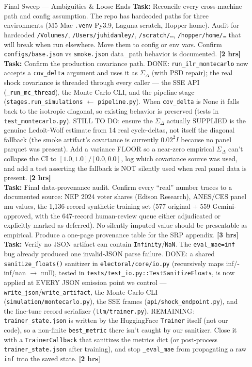 \documentclass[11pt]{article}
\newcommand{\hrs}[1]{\textbf{[#1 hrs]}}
\newcommand{\task}[2]{%
  \noindent\textbf{Task:} #1 \hfill \hrs{#2}\\}
\begin{document}
\begin{taskbox}{Final Sweep --- Ambiguities \& Loose Ends}
\task{Reconcile every cross-machine path and config assumption. The repo
  has hardcoded paths for three environments (M5 Mac \texttt{.venv} Py3.9,
  Laguna scratch, Hopper home). Audit for hardcoded \texttt{/Volumes/},
  \texttt{/Users/juhidamley/}, \texttt{/scratch/\ldots},
  \texttt{/hopper/home/\ldots} that will break when run elsewhere. Move them
  to config or env vars. Confirm \texttt{configs/base.json}
  vs \texttt{smoke.json} data\_path behavior is documented.}{2}

\task{Confirm the production covariance path. DONE: \texttt{run\_ilr\_montecarlo}
  now accepts a \texttt{cov\_delta} argument and uses it as $\Sigma_\Delta$ (with
  PSD repair); the real shock covariance is threaded through every caller --- the
  SSE API (\texttt{\_run\_mc\_thread}), the Monte Carlo CLI, and the pipeline
  stage (\texttt{stages.run\_simulations} $\leftarrow$ \texttt{pipeline.py}). When
  \texttt{cov\_delta} is None it falls back to the isotropic diagonal, so existing
  behavior is preserved (tests in \texttt{test\_montecarlo.py}). STILL TO DO:
  ensure the $\Sigma_\Delta$ actually SUPPLIED is the genuine Ledoit-Wolf estimate
  from 14 real cycle-deltas, not itself the diagonal fallback (the smoke artifact's
  covariance is currently $0.02^2 I$ because no panel parquet was present). Add a
  variance FLOOR so a near-zero empirical $\Sigma_\Delta$ can't collapse the CI to
  $[1.0,1.0]/[0.0,0.0]$, log which covariance source was used, and add a test
  asserting the fallback is NOT silently used when real panel data is present.}{2}

\task{Final data-provenance audit. Confirm every ``real'' number traces to
  a documented source: NEP 2024 voter shares (Edison Research), ANES/CES
  panel mu values, the 1,136-record synthetic training set (577 original
  + 559 Gemini-approved, with the 647-record human-review queue either
  adjudicated or explicitly marked as deferred). No silently-imputed value
  should be presentable as empirical. Produce a one-page provenance table
  for the SRP appendix.}{3}

\task{Verify no JSON artifact can contain \texttt{Infinity}/\texttt{NaN}.
  The \texttt{eval\_mae=inf} bug already produced one invalid-JSON parse failure.
  DONE: a shared \texttt{sanitize\_floats()} sanitizer in
  \texttt{electoral/core/io.py} (recursively maps inf/-inf/nan $\to$ null), tested
  in \texttt{tests/test\_io.py::TestSanitizeFloats}, is now applied at EVERY JSON
  emission point we control --- \texttt{write\_json}/\texttt{write\_artifact}, the
  Monte Carlo CLI (\texttt{simulation/montecarlo.py}), the SSE frames
  (\texttt{api/shock\_endpoint.py}), and the fine-tune record serializer
  (\texttt{llm/trainer.py}). REMAINING: \texttt{trainer\_state.json} is written by
  the HuggingFace \texttt{Trainer} itself (not our code), so a non-finite
  \texttt{best\_metric} there isn't caught by our sanitizer. Close it with a
  \texttt{TrainerCallback} that sanitizes the metrics dict (or post-process
  \texttt{trainer\_state.json} after training), and stop \texttt{\_eval\_mae} from
  propagating a raw \texttt{inf} into the saved state.}{2}


\end{taskbox}
\end{document}
